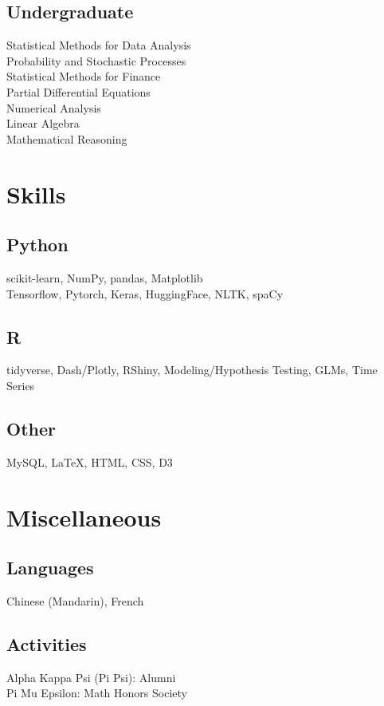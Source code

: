 \documentclass[]{deedy-resume-openfont}
\begin{document}
\begin{minipage}[t]{0.33\textwidth}
\subsection{Undergraduate} 
Statistical Methods for Data Analysis \\
Probability and Stochastic Processes \\
Statistical Methods for Finance \\
Partial Differential Equations \\
Numerical Analysis \\
Linear Algebra \\
Mathematical Reasoning \\
\sectionsep





\section{Skills}
\subsection{Python}
scikit-learn, NumPy, pandas, Matplotlib \\
Tensorflow, Pytorch, Keras, HuggingFace, NLTK, spaCy \\
\subsection{R}
tidyverse, Dash/Plotly, RShiny, Modeling/Hypothesis Testing,
GLMs, Time Series
\subsection{Other}
MySQL, \LaTeX, HTML, CSS, D3
\sectionsep

\section{Miscellaneous}
\subsection{Languages}
Chinese (Mandarin), French
\subsection{Activities}
Alpha Kappa Psi (Pi Psi): Alumni \\
Pi Mu Epsilon: Math Honors Society
\sectionsep

%
%

\end{minipage} 
\end{document}

